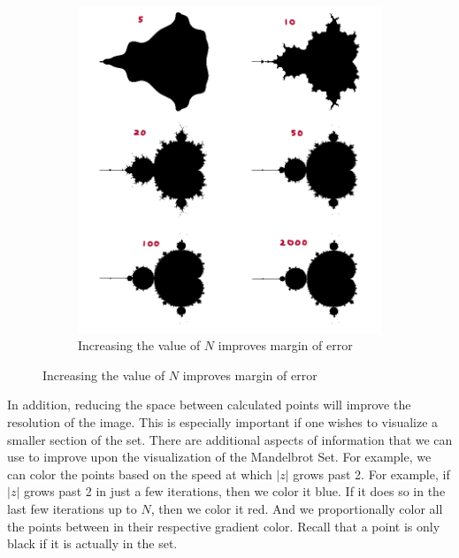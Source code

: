 \documentclass[20pt]{article} %
\begin{document}
\begin{figure}[!htbp]
  	\centering
   	\begin{subfigure}[p]{0.7\linewidth}
    	\includegraphics[width=\linewidth]{./figures/iterationImg.png}
	\caption{Increasing the value of $N$ improves margin of error}
   	\end{subfigure}
\end{figure}

\newpage
In addition, reducing the space between calculated points will improve the resolution of the image.  This is especially important if one wishes to visualize a smaller section of the set.
There are additional aspects of information that we can use to improve upon the visualization of the Mandelbrot Set.  For example, we can color the points based on the speed at which $|z|$ grows past 2.  For example, if $|z|$ grows past 2 in just a few iterations, then we color it blue.  If it does so in the last few iterations up to $N$, then we color it red.  And we proportionally color all the points between in their respective gradient color. Recall that a point is only black if it is actually in the set.
\end{document}
